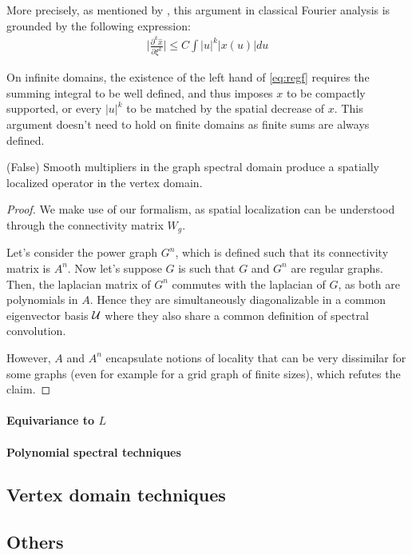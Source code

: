 More precisely, as mentioned by \cite{henaff2015deep}, this argument in classical Fourier analysis is grounded by the following expression:
\begin{gather}
\bigg|\frac{\partial^k{\hat{x}}}{\partial{\xi^k}}\bigg| \leq C \int |u|^k|x(u)|du \label{eq:regf}
\end{gather}

On infinite domains, the existence of the left hand of \eqref{eq:regf} requires the summing integral to be well defined, and thus imposes $x$ to be compactly supported, or every $|u|^k$ to be matched by the spatial decrease of $x$. This argument doesn't need to hold on finite domains as finite sums are always defined.

\begin{claim} (False) Smooth multipliers in the graph spectral domain produce a spatially localized operator in the vertex domain.
\end{claim}

\begin{proof} We make use of our formalism, as spatial localization can be understood through the connectivity matrix $W_g$.

Let's consider the power graph $G^n$, which is defined such that its connectivity matrix is $A^n$. Now let's suppose $G$ is such that $G$ and $G^n$ are regular graphs. Then, the laplacian matrix of $G^n$ commutes with the laplacian of $G$, as both are polynomials in $A$. Hence they are simultaneously diagonalizable in a common eigenvector basis $\mathcal{U}$ where they also share a common definition of spectral convolution.

However, $A$ and $A^n$ encapsulate notions of locality that can be very dissimilar for some graphs (even for example for a grid graph of finite sizes), which refutes the claim.
\end{proof}

\paragraph{Equivariance to $L$}

\todo{}

\paragraph{Polynomial spectral techniques}


\subsection{Vertex domain techniques}

\subsection{Others}

